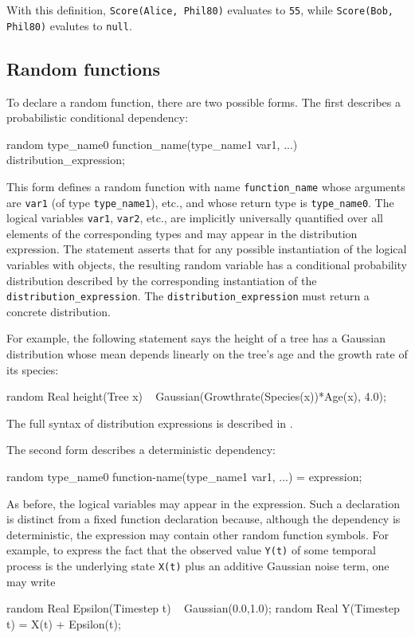 With this definition, {\tt Score(Alice, Phil80)} evaluates to \verb|55|, while
{\tt Score(Bob, Phil80)} evalutes to \verb|null|.



\subsection{Random functions}\label{random-function-section}

To declare a random function, there are two possible forms. The first describes a probabilistic
conditional dependency:
\begin{blogcode}
random type_name0 function_name(type_name1 var1, ...) ~ 
  distribution_expression;
\end{blogcode}
This form defines a random function with name \texttt{function\_name} whose arguments are {\tt var1} (of type \verb|type_name1|), etc.,
and whose return type is \verb|type_name0|. The logical variables {\tt var1}, {\tt var2}, etc., are implicitly universally quantified over
all elements of the corresponding types and may appear in the distribution expression. The statement asserts that for any possible instantiation of the
logical variables with objects, the resulting random variable has a conditional probability distribution
described by the corresponding instantiation of the {\tt distribution\_expression}. The {\tt distribution\_expression} must return a concrete distribution. 

For example, the following statement says the height of a tree has a Gaussian distribution
whose mean depends linearly on the tree's age and the growth rate of its species:
\begin{blogcode}
random Real height(Tree x) ~
    Gaussian(Growthrate(Species(x))*Age(x), 4.0);
\end{blogcode}
The full syntax of distribution expressions is described in .

The second form describes a deterministic dependency:
\begin{blogcode}
random type_name0 function-name(type_name1 var1, ...) = expression;
\end{blogcode}
As before, the logical variables may appear in the expression.
Such a declaration is distinct from a fixed function declaration because, although the dependency is deterministic,
the expression may contain other random function symbols. For example, 
to express the fact that the observed value {\tt Y(t)} of some temporal process 
is the underlying state {\tt X(t)} plus an additive Gaussian noise term, one may write
\begin{blogcode}
random Real Epsilon(Timestep t) ~ Gaussian(0.0,1.0);
random Real Y(Timestep t) = X(t) + Epsilon(t);
\end{blogcode}
